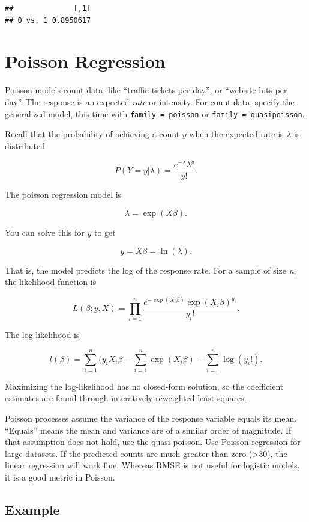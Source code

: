 \documentclass[
]{book}
\begin{document}
\begin{verbatim}
##              [,1]
## 0 vs. 1 0.8950617
\end{verbatim}

\hypertarget{poisson-regression}{%
\section{Poisson Regression}\label{poisson-regression}}

Poisson models count data, like ``traffic tickets per day'', or ``website hits per day''. The response is an expected \emph{rate} or intensity. For count data, specify the generalized model, this time with \texttt{family\ =\ poisson} or \texttt{family\ =\ quasipoisson}.

Recall that the probability of achieving a count \(y\) when the expected rate is \(\lambda\) is distributed

\[P(Y = y|\lambda) = \frac{e^{-\lambda} \lambda^y}{y!}.\]

The poisson regression model is

\[\lambda = \exp(X \beta).\]

You can solve this for \(y\) to get

\[y = X\beta = \ln(\lambda).\]

That is, the model predicts the log of the response rate. For a sample of size \emph{n}, the likelihood function is

\[L(\beta; y, X) = \prod_{i=1}^n \frac{e^{-\exp({X_i\beta})}\exp({X_i\beta})^{y_i}}{y_i!}.\]

The log-likelihood is

\[l(\beta) = \sum_{i=1}^n (y_i X_i \beta - \sum_{i=1}^n\exp(X_i\beta) - \sum_{i=1}^n\log(y_i!).\]

Maximizing the log-likelihood has no closed-form solution, so the coefficient estimates are found through interatively reweighted least squares.

Poisson processes assume the variance of the response variable equals its mean. ``Equals'' means the mean and variance are of a similar order of magnitude. If that assumption does not hold, use the quasi-poisson. Use Poisson regression for large datasets. If the predicted counts are much greater than zero (\textgreater30), the linear regression will work fine. Whereas RMSE is not useful for logistic models, it is a good metric in Poisson.

\hypertarget{example-1}{%
\subsection*{Example}\label{example-1}}
\end{document}
